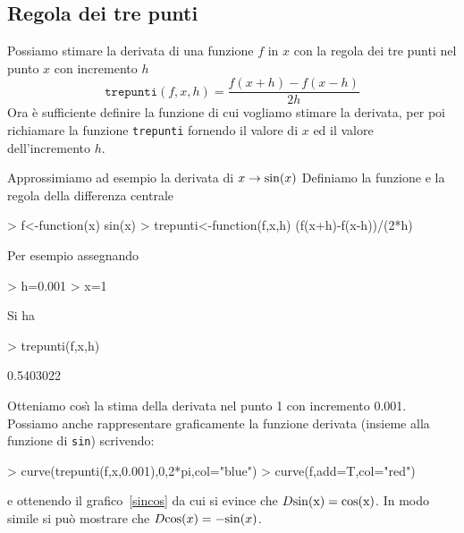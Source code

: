 \documentclass[onecolumn,11pt]{book}
\begin{document}
 \subsection{Regola dei tre punti}
Possiamo stimare la derivata di una funzione $f$ in $x$ con la regola dei tre punti nel punto $x$ con incremento $h$
$$
\texttt{trepunti}(f,x,h)=\frac{f(x+h)-f(x-h)}{2h}
$$
Ora \`e sufficiente definire la funzione di cui vogliamo stimare la derivata, per poi richiamare la funzione \texttt{trepunti} fornendo il valore di $x$ ed il valore dell'incremento $h$.

Approssimiamo ad esempio la derivata di $x\rightarrow {\rm sin}(x)$
Definiamo la funzione e la regola della differenza centrale
\begin{Schunk}
\begin{Sinput}
> f<-function(x) sin(x)
> trepunti<-function(f,x,h) (f(x+h)-f(x-h))/(2*h)
\end{Sinput}
\end{Schunk}
Per esempio assegnando  
\begin{Schunk}
\begin{Sinput}
> h=0.001
> x=1
\end{Sinput}
\end{Schunk}
Si ha 
\begin{Schunk}
\begin{Sinput}
> trepunti(f,x,h)
\end{Sinput}
\begin{Soutput}
[1] 0.5403022
\end{Soutput}
\end{Schunk}
Otteniamo cos\`\i\; la stima della derivata nel punto 1 con incremento 0.001.
Possiamo anche rappresentare graficamente la funzione derivata (insieme alla funzione di \texttt{sin}) scrivendo:
\begin{Schunk}
\begin{Sinput}
> curve(trepunti(f,x,0.001),0,2*pi,col="blue")
> curve(f,add=T,col="red")
\end{Sinput}
\end{Schunk}
e ottenendo il grafico~\ref{sincos} da cui si evince che  $D\rm{sin}(x)={\rm cos}(x)$. In modo simile si pu\`o mostrare che 
$D{\rm cos}(x)=-{\rm sin}(x)$.
\end{document}
